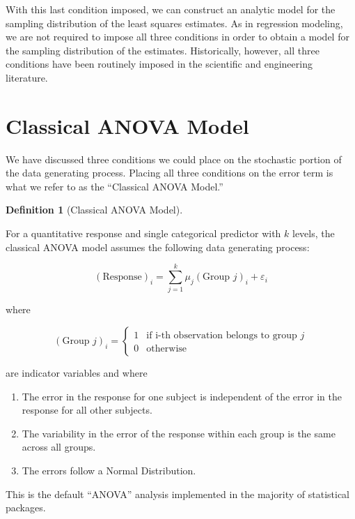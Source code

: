 \documentclass[
  letterpaper,
  DIV=11,
  numbers=noendperiod]{scrreprt}
\providecommand{\tightlist}{%
  \setlength{\itemsep}{0pt}\setlength{\parskip}{0pt}}\usepackage{longtable,booktabs,array}
\theoremstyle{definition}
\newtheorem{definition}{Definition}[chapter]
\theoremstyle{definition}
\theoremstyle{plain}
\theoremstyle{remark}
\begin{document}
With this last condition imposed, we can construct an analytic model for
the sampling distribution of the least squares estimates. As in
regression modeling, we are not required to impose all three conditions
in order to obtain a model for the sampling distribution of the
estimates. Historically, however, all three conditions have been
routinely imposed in the scientific and engineering literature.

\section{Classical ANOVA Model}\label{classical-anova-model}

We have discussed three conditions we could place on the stochastic
portion of the data generating process. Placing all three conditions on
the error term is what we refer to as the ``Classical ANOVA Model.''

\begin{definition}[Classical ANOVA
Model]\protect\hypertarget{def-classical-anova}{}\label{def-classical-anova}

For a quantitative response and single categorical predictor with \(k\)
levels, the classical ANOVA model assumes the following data generating
process:

\[(\text{Response})_i = \sum_{j=1}^{k} \mu_j (\text{Group } j)_i + \varepsilon_i\]

where

\[
(\text{Group } j)_{i} = \begin{cases}
  1 & \text{if i-th observation belongs to group } j \\
  0 & \text{otherwise}
  \end{cases}
\]

are indicator variables and where

\begin{enumerate}
\def\labelenumi{\arabic{enumi}.}
\tightlist
\item
  The error in the response for one subject is independent of the error
  in the response for all other subjects.
\item
  The variability in the error of the response within each group is the
  same across all groups.
\item
  The errors follow a Normal Distribution.
\end{enumerate}

This is the default ``ANOVA'' analysis implemented in the majority of
statistical packages.

\end{definition}
\end{document}
